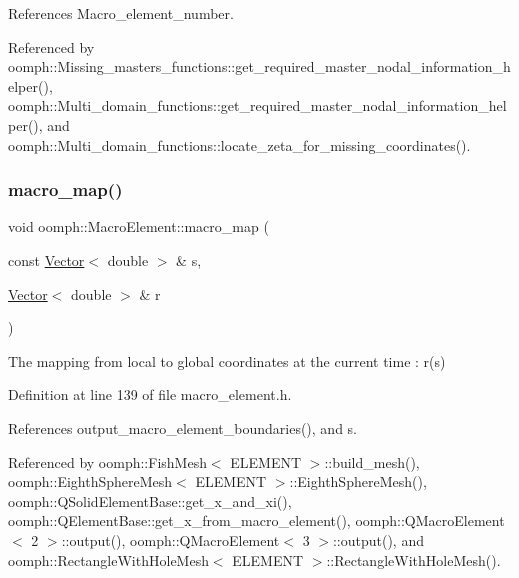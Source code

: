 References Macro\+\_\+element\+\_\+number.



Referenced by oomph\+::\+Missing\+\_\+masters\+\_\+functions\+::get\+\_\+required\+\_\+master\+\_\+nodal\+\_\+information\+\_\+helper(), oomph\+::\+Multi\+\_\+domain\+\_\+functions\+::get\+\_\+required\+\_\+master\+\_\+nodal\+\_\+information\+\_\+helper(), and oomph\+::\+Multi\+\_\+domain\+\_\+functions\+::locate\+\_\+zeta\+\_\+for\+\_\+missing\+\_\+coordinates().

\mbox{\label{classoomph_1_1MacroElement_a85e7842ad949bb4062a9ff302fa452e5}} 
\subsubsection{\texorpdfstring{macro\+\_\+map()}{macro\_map()}\hspace{0.1cm}{\footnotesize\ttfamily [1/2]}}
{\footnotesize\ttfamily void oomph\+::\+Macro\+Element\+::macro\+\_\+map (\begin{DoxyParamCaption}\item[{const \hyperlink{classoomph_1_1Vector}{Vector}$<$ double $>$ \&}]{s,  }\item[{\hyperlink{classoomph_1_1Vector}{Vector}$<$ double $>$ \&}]{r }\end{DoxyParamCaption})\hspace{0.3cm}{\ttfamily [inline]}}



The mapping from local to global coordinates at the current time \+: r(s) 



Definition at line 139 of file macro\+\_\+element.\+h.



References output\+\_\+macro\+\_\+element\+\_\+boundaries(), and s.



Referenced by oomph\+::\+Fish\+Mesh$<$ E\+L\+E\+M\+E\+N\+T $>$\+::build\+\_\+mesh(), oomph\+::\+Eighth\+Sphere\+Mesh$<$ E\+L\+E\+M\+E\+N\+T $>$\+::\+Eighth\+Sphere\+Mesh(), oomph\+::\+Q\+Solid\+Element\+Base\+::get\+\_\+x\+\_\+and\+\_\+xi(), oomph\+::\+Q\+Element\+Base\+::get\+\_\+x\+\_\+from\+\_\+macro\+\_\+element(), oomph\+::\+Q\+Macro\+Element$<$ 2 $>$\+::output(), oomph\+::\+Q\+Macro\+Element$<$ 3 $>$\+::output(), and oomph\+::\+Rectangle\+With\+Hole\+Mesh$<$ E\+L\+E\+M\+E\+N\+T $>$\+::\+Rectangle\+With\+Hole\+Mesh().

